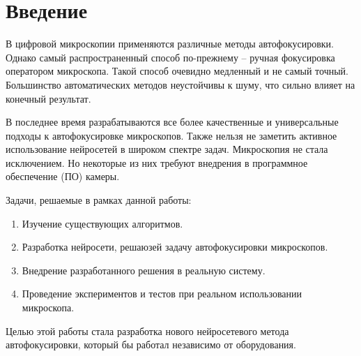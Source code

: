 \chapter*{Введение} %

В цифровой микроскопии применяются различные методы автофокусировки. Однако самый распространенный способ по-прежнему -- ручная фокусировка оператором микроскопа. Такой способ очевидно медленный и не самый точный. Большинство автоматических методов неустойчивы к шуму, что сильно влияет на конечный результат.

В последнее время разрабатываются все более качественные и универсальные подходы к автофокусировке микроскопов. Также нельзя не заметить активное использование нейросетей в широком спектре задач. Микроскопия не стала исключением. Но некоторые из них требуют внедрения в программное обеспечение (ПО) камеры.

Задачи, решаемые в рамках данной работы:
\begin{enumerate}
	\item Изучение существующих алгоритмов.
	\item Разработка нейросети, решаюзей задачу автофокусировки микроскопов.
	\item Внедрение разработанного решения в реальную систему.
	\item Проведение экспериментов и тестов при реальном использовании микроскопа.
\end{enumerate} 

Целью этой работы стала разработка нового нейросетевого метода автофокусировки, который бы работал независимо от оборудования.


